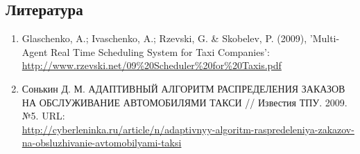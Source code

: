 	\subsection{Литература}

		\begin{enumerate}
			\item{Glaschenko, A.; Ivaschenko, A.; Rzevski, G. \& Skobelev, P. (2009), 'Multi-Agent Real Time Scheduling System for Taxi Companies':\\ \url{http://www.rzevski.net/09%20Scheduler%20for%20Taxis.pdf}}

			\item{Сонькин Д. М. АДАПТИВНЫЙ АЛГОРИТМ РАСПРЕДЕЛЕНИЯ ЗАКАЗОВ НА ОБСЛУЖИВАНИЕ АВТОМОБИЛЯМИ ТАКСИ // Известия ТПУ. 2009.  №5. URL:\\ \url{http://cyberleninka.ru/article/n/adaptivnyy-algoritm-raspredeleniya-zakazov-na-obsluzhivanie-avtomobilyami-taksi}}
		\end{enumerate}